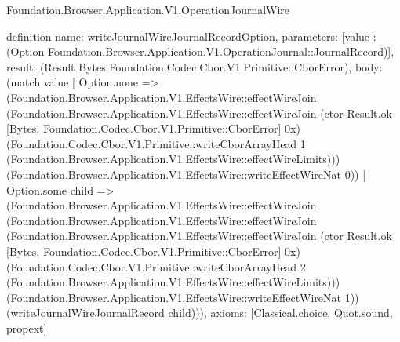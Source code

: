 \begin{lexlean}{Foundation.Browser.Application.V1.OperationJournalWire}
\begin{semanticmodule}
definition{
  name: writeJournalWireJournalRecordOption,
  parameters: [value : (Option Foundation.Browser.Application.V1.OperationJournal::JournalRecord)],
  result: (Result Bytes Foundation.Codec.Cbor.V1.Primitive::CborError),
  body: (match value
    | Option.none => (Foundation.Browser.Application.V1.EffectsWire::effectWireJoin (Foundation.Browser.Application.V1.EffectsWire::effectWireJoin (ctor Result.ok [Bytes, Foundation.Codec.Cbor.V1.Primitive::CborError] 0x) (Foundation.Codec.Cbor.V1.Primitive::writeCborArrayHead 1 (Foundation.Browser.Application.V1.EffectsWire::effectWireLimits))) (Foundation.Browser.Application.V1.EffectsWire::writeEffectWireNat 0))
    | Option.some child => (Foundation.Browser.Application.V1.EffectsWire::effectWireJoin (Foundation.Browser.Application.V1.EffectsWire::effectWireJoin (Foundation.Browser.Application.V1.EffectsWire::effectWireJoin (ctor Result.ok [Bytes, Foundation.Codec.Cbor.V1.Primitive::CborError] 0x) (Foundation.Codec.Cbor.V1.Primitive::writeCborArrayHead 2 (Foundation.Browser.Application.V1.EffectsWire::effectWireLimits))) (Foundation.Browser.Application.V1.EffectsWire::writeEffectWireNat 1)) (writeJournalWireJournalRecord child))),
  axioms: [Classical.choice, Quot.sound, propext]
}


\end{semanticmodule}
\end{lexlean}
